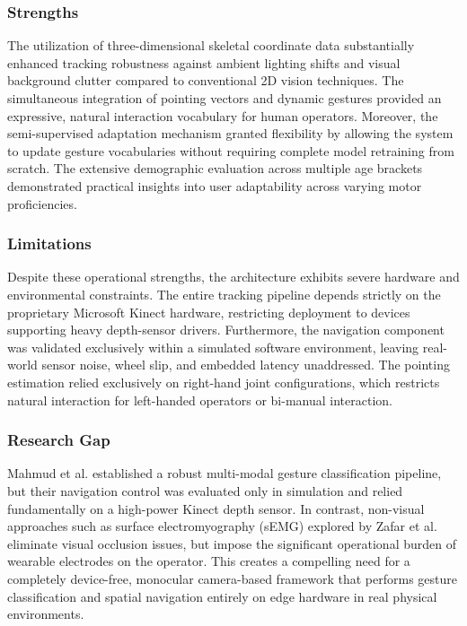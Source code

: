\subsubsection{Strengths}
The utilization of three-dimensional skeletal coordinate data substantially enhanced tracking robustness against ambient lighting shifts and visual background clutter compared to conventional 2D vision techniques. The simultaneous integration of pointing vectors and dynamic gestures provided an expressive, natural interaction vocabulary for human operators. Moreover, the semi-supervised adaptation mechanism granted flexibility by allowing the system to update gesture vocabularies without requiring complete model retraining from scratch. The extensive demographic evaluation across multiple age brackets demonstrated practical insights into user adaptability across varying motor proficiencies.

\subsubsection{Limitations}
Despite these operational strengths, the architecture exhibits severe hardware and environmental constraints. The entire tracking pipeline depends strictly on the proprietary Microsoft Kinect hardware, restricting deployment to devices supporting heavy depth-sensor drivers. Furthermore, the navigation component was validated exclusively within a simulated software environment, leaving real-world sensor noise, wheel slip, and embedded latency unaddressed. The pointing estimation relied exclusively on right-hand joint configurations, which restricts natural interaction for left-handed operators or bi-manual interaction.

\subsubsection{Research Gap}
Mahmud et al. established a robust multi-modal gesture classification pipeline, but their navigation control was evaluated only in simulation and relied fundamentally on a high-power Kinect depth sensor. In contrast, non-visual approaches such as surface electromyography (sEMG) explored by Zafar et al. \cite{zafar2023} eliminate visual occlusion issues, but impose the significant operational burden of wearable electrodes on the operator. This creates a compelling need for a completely device-free, monocular camera-based framework that performs gesture classification and spatial navigation entirely on edge hardware in real physical environments.

